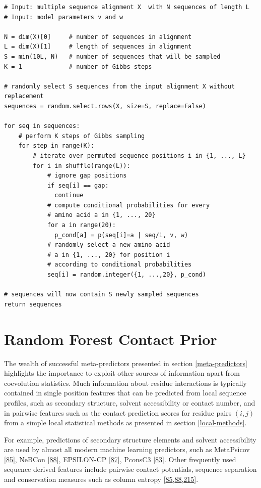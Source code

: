\documentclass[11pt,a4paper,twoside]{book}
\theoremstyle{definition}
\theoremstyle{definition}
\theoremstyle{remark}
\begin{document}
\begin{verbatim}
# Input: multiple sequence alignment X  with N sequences of length L
# Input: model parameters v and w

N = dim(X)[0]     # number of sequences in alignment
L = dim(X)[1]     # length of sequences in alignment
S = min(10L, N)   # number of sequences that will be sampled
K = 1             # number of Gibbs steps

# randomly select S sequences from the input alignment X without replacement
sequences = random.select.rows(X, size=S, replace=False)

for seq in sequences:
    # perform K steps of Gibbs sampling
    for step in range(K):
        # iterate over permuted sequence positions i in {1, ..., L}
        for i in shuffle(range(L)):
            # ignore gap positions
            if seq[i] == gap:
              continue
            # compute conditional probabilities for every 
            # amino acid a in {1, ..., 20}
            for a in range(20):
              p_cond[a] = p(seq[i]=a | seq/i, v, w)
            # randomly select a new amino acid 
            # a in {1, ..., 20} for position i 
            # according to conditional probabilities
            seq[i] = random.integer({1, ...,20}, p_cond)

# sequences will now contain S newly sampled sequences
return sequences
\end{verbatim}

\chapter{Random Forest Contact Prior}\label{contact-prior}

The wealth of successful meta-predictors presented in section
\ref{meta-predictors} highlights the importance to exploit other sources
of information apart from coevolution statistics. Much information about
residue interactions is typically contained in single position features
that can be predicted from local sequence profiles, such as secondary
structure, solvent accessibility or contact number, and in pairwise
features such as the contact prediction scores for residue pairs
\((i,j)\) from a simple local statistical methods as presented in
section \ref{local-methods}.

For example, predictions of secondary structure elements and solvent
accessibility are used by almost all modern machine learning predictors,
such as MetaPsicov {[}\protect\hyperlink{ref-Jones2015a}{85}{]}, NeBCon
{[}\protect\hyperlink{ref-He2017}{88}{]}, EPSILON-CP
{[}\protect\hyperlink{ref-Stahl2017}{87}{]}, PconsC3
{[}\protect\hyperlink{ref-Skwark2016}{83}{]}. Other frequently used
sequence derived features include pairwise contact potentials, sequence
separation and conservation measures such as column entropy
{[}\protect\hyperlink{ref-Jones2015a}{85},\protect\hyperlink{ref-He2017}{88},\protect\hyperlink{ref-Ma2015a}{215}{]}.
\end{document}
